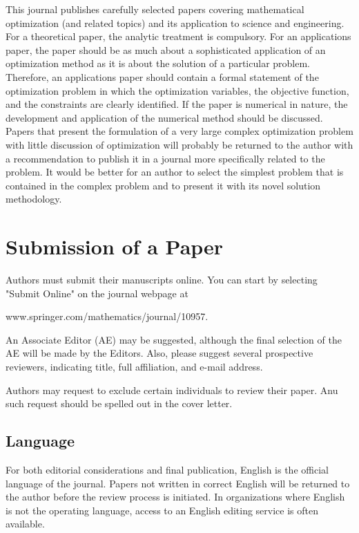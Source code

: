 \documentclass[smallextended,referee,envcountsect,]{svjour3}
\begin{document}
This journal publishes carefully selected papers covering mathematical optimization (and related topics) and its application to science and engineering. For a theoretical paper, the analytic treatment is compulsory. For an applications paper, the paper should be as much about a sophisticated application of an optimization method as it is about the solution of a particular problem. Therefore, an applications paper should contain a formal statement of the optimization problem in which the optimization variables, the objective function, and the constraints are clearly identified. If the paper is numerical in nature, the development and application of the numerical method should be discussed. Papers that present the formulation of a very large complex optimization problem with little discussion of optimization will probably be returned to the author with a recommendation to publish it in a journal more specifically related to the problem. It would be better for an author to select the simplest problem that is contained in the complex problem and to present it with its novel solution methodology.

\section{Submission of a Paper}

Authors must submit their manuscripts online.  You can start by selecting "Submit Online" on the journal webpage at

www.springer.com/mathematics/journal/10957.

An Associate Editor  (AE) may be suggested, although the final selection of the AE will be made by the Editors. Also, please suggest several prospective reviewers, indicating title, full affiliation, and e-mail address.

Authors may request to exclude certain individuals to review their paper. Anu such request should be spelled out in the cover letter.

\subsection{Language}

 For both editorial considerations and final publication, English is the official language of the journal. Papers not written in correct English will be returned to the author before the review process is initiated. In organizations where English is not the operating language, access to an English editing service is often available.
\end{document}
